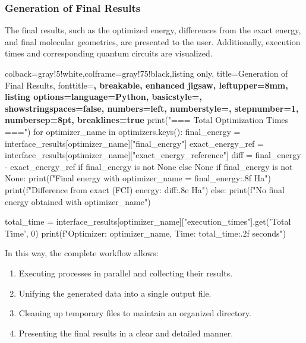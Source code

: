 \subsubsection{Generation of Final Results}
The final results, such as the optimized energy, differences from the exact energy, and final molecular geometries, are presented to the user. Additionally, execution times and corresponding quantum circuits are visualized.

\begin{tcblisting}{colback=gray!5!white,colframe=gray!75!black,listing only,
    title=Generation of Final Results, fonttitle=\bfseries, breakable, enhanced jigsaw, leftupper=8mm,
    listing options={language=Python, basicstyle=\ttfamily\small,
    showstringspaces=false, numbers=left, numberstyle=\footnotesize,
    stepnumber=1, numbersep=8pt, breaklines=true}}
print("=== Total Optimization Times ===\n")
for optimizer_name in optimizers.keys():
    final_energy = interface_results[optimizer_name]["final_energy"]
    exact_energy_ref = interface_results[optimizer_name]["exact_energy_reference"]
    diff = final_energy - exact_energy_ref if final_energy is not None else None
    if final_energy is not None:
        print(f"Final energy with {optimizer_name} = {final_energy:.8f} Ha")
        print(f"Difference from exact (FCI) energy: {diff:.8e} Ha\n")
    else:
        print(f"No final energy obtained with {optimizer_name}\n")

    total_time = interface_results[optimizer_name]["execution_times"].get('Total Time', 0)
    print(f"Optimizer: {optimizer_name}, Time: {total_time:.2f} seconds")
\end{tcblisting}

In this way, the complete workflow allows:
\begin{enumerate}
    \item Executing processes in parallel and collecting their results.
    \item Unifying the generated data into a single output file.
    \item Cleaning up temporary files to maintain an organized directory.
    \item Presenting the final results in a clear and detailed manner.
\end{enumerate}
